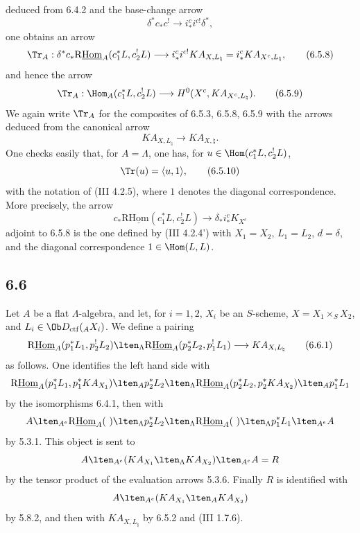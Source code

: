 deduced from 6.4.2 and the base-change arrow
\[
\delta^*c_*c^!\longrightarrow i_*^ci^{c!}\delta^*,
\]
one obtains an arrow
\begin{equation}
\Tr_A:\delta^*c_*\mathrm{R}\underline{\mathrm{Hom}}_A(c_1^*L,c_2^!L)
\longrightarrow
i_*^ci^{c!}KA_{X,L_{\natural}}
=i_*^cKA_{X^c,L_{\natural}},
\tag{6.5.8}
\end{equation}
and hence the arrow
\begin{equation}
\Tr_A:\Hom_A(c_1^*L,c_2^!L)
\longrightarrow
H^0(X^c,KA_{X^c,L_{\natural}}).
\tag{6.5.9}
\end{equation}
We again write $\Tr_A$ for the composites of 6.5.3, 6.5.8, 6.5.9 with the arrows deduced from the canonical arrow
\[
KA_{X,L_{\natural}}\longrightarrow KA_{X,\natural}.
\]
One checks easily that, for $A=\Lambda$, one has, for $u\in\Hom(c_1^*L,c_2^!L)$,
\begin{equation}
\Tr(u)=\langle u,1\rangle,
\tag{6.5.10}
\end{equation}
with the notation of (III 4.2.5), where $1$ denotes the diagonal correspondence. More precisely, the arrow
\[
c_*\mathrm{R}\underline{\mathrm{Hom}}(c_1^*L,c_2^!L)\longrightarrow \delta_*i_*^cK_{X^c}
\]
adjoint to 6.5.8 is the one defined by (III 4.2.4') with $X_1=X_2$, $L_1=L_2$, $d=\delta$, and the diagonal correspondence $1\in\Hom(L,L)$.

\subsection*{6.6}
Let $A$ be a flat $\Lambda$-algebra, and let, for $i=1,2$, $X_i$ be an $S$-scheme, $X=X_1\times_SX_2$, and $L_i\in\Ob D_{\mathrm{ctf}}({}_AX_i)$. We define a pairing
\begin{equation}
\mathrm{R}\underline{\mathrm{Hom}}_A(p_1^*L_1,p_2^!L_2)
\lten_{\Lambda}
\mathrm{R}\underline{\mathrm{Hom}}_A(p_2^*L_2,p_1^!L_1)
\longrightarrow
KA_{X,L_{\natural}}
\tag{6.6.1}
\end{equation}
as follows. One identifies the left hand side with
\[
\mathrm{R}\underline{\mathrm{Hom}}_A(p_1^*L_1,p_1^*KA_{X_1})
\lten_A p_2^*L_2
\lten_{\Lambda}
\mathrm{R}\underline{\mathrm{Hom}}_A(p_2^*L_2,p_2^*KA_{X_2})
\lten_A p_1^*L_1
\]
by the isomorphisms 6.4.1, then with
\[
A\lten_{A^e}\mathrm{R}\underline{\mathrm{Hom}}_A(\ )\lten_{\Lambda}p_2^*L_2
 \lten_{\Lambda}\mathrm{R}\underline{\mathrm{Hom}}_A(\ )\lten_{\Lambda}p_1^*L_1\lten_{A^e}A
\]
by 5.3.1. This object is sent to
\[
A\lten_{A^e}(KA_{X_1}\lten_{\Lambda}KA_{X_2})\lten_{A^e}A=R
\]
by the tensor product of the evaluation arrows 5.3.6. Finally $R$ is identified with
\[
A\lten_{A^e}(KA_{X_1}\lten_AKA_{X_2})
\]
by 5.8.2, and then with $KA_{X,L_{\natural}}$ by 6.5.2 and (III 1.7.6).

